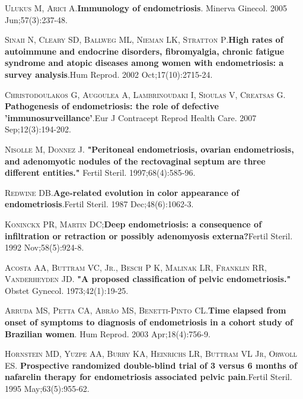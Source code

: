 \documentclass[12pt]{article} %
\begin{document}
\textsc{Ulukus M, Arici A}.\textbf{Immunology of endometriosis}. Minerva Ginecol. 2005 Jun;57(3):237-48.

\vspace{0,5cm}

\textsc{Sinaii N, Cleary SD, Ballweg ML, Nieman LK, Stratton P}.\textbf{High rates of autoimmune and endocrine disorders, fibromyalgia, chronic fatigue syndrome and atopic diseases among women with endometriosis: a survey analysis}.Hum Reprod. 2002 Oct;17(10):2715-24.

\vspace{0,5cm}

\textsc{Christodoulakos G, Augoulea A, Lambrinoudaki I, Sioulas V, Creatsas G}. \textbf{Pathogenesis of endometriosis: the role of defective 'immunosurveillance'}.Eur J Contracept Reprod Health Care. 2007 Sep;12(3):194-202.

\vspace{0,5cm}

\textsc{Nisolle M, Donnez J.} \textbf{"Peritoneal endometriosis, ovarian endometriosis, and
adenomyotic nodules of the rectovaginal septum are three different entities."}
Fertil Steril. 1997;68(4):585-96.

\vspace{0,5cm}

\textsc{Redwine DB}.\textbf{Age-related evolution in color appearance of endometriosis}.Fertil Steril. 1987 Dec;48(6):1062-3.

\vspace{0,5cm}

\textsc{Koninckx PR, Martin DC};\textbf{Deep endometriosis: a consequence of infiltration or retraction or possibly adenomyosis externa?}Fertil Steril. 1992 Nov;58(5):924-8.

\vspace{0,5cm}

\textsc{Acosta AA, Buttram VC, Jr., Besch P K, Malinak LR, Franklin RR,
Vanderheyden JD}.\textbf{ "A proposed classification of pelvic endometriosis."}
Obstet Gynecol. 1973;42(1):19-25.

\vspace{0,5cm}


\textsc{Arruda MS, Petta CA, Abrão MS, Benetti-Pinto CL}.\textbf{Time elapsed from onset of symptoms to diagnosis of endometriosis in a cohort study of Brazilian women}. Hum Reprod. 2003 Apr;18(4):756-9.

\vspace{0,5cm}

\textsc{Hornstein MD, Yuzpe AA, Burry KA, Heinrichs LR, Buttram VL Jr, Orwoll ES}. \textbf{Prospective randomized double-blind trial of 3 versus 6 months of nafarelin therapy for endometriosis associated pelvic pain}.Fertil Steril. 1995 May;63(5):955-62.
\end{document}
